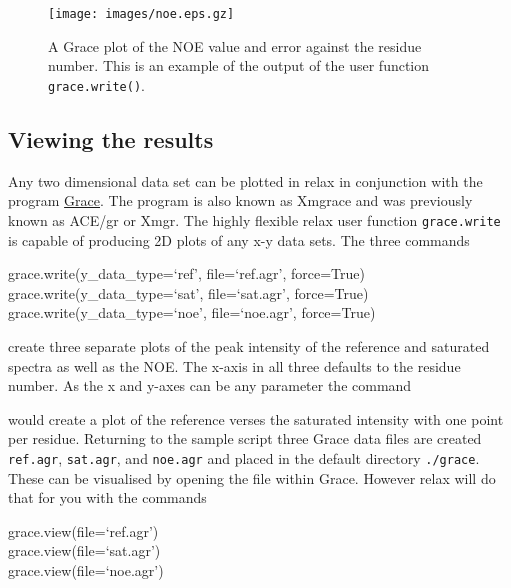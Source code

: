 
\begin{figure}
\centerline{\texttt{[image: images/noe.eps.gz]}}
\caption[NOE plot]{A Grace plot of the NOE value and error against the residue number.  This is an example of the output of the user function \texttt{grace.write()}.}\label{fig: NOE plot}
\end{figure}


\subsection{Viewing the results}

Any two dimensional data set can be plotted in relax in conjunction with the program \href{http://plasma-gate.weizmann.ac.il/Grace/}{Grace}.  The program is also known as Xmgrace and was previously known as ACE/gr or Xmgr.  The highly flexible relax user function \texttt{grace.write} is capable of producing 2D plots of any x-y data sets.  The three commands

\begin{exampleenv}
grace.write(y\_data\_type=`ref', file=`ref.agr', force=True) \\
grace.write(y\_data\_type=`sat', file=`sat.agr', force=True) \\
grace.write(y\_data\_type=`noe', file=`noe.agr', force=True)
\end{exampleenv}

create three separate plots of the peak intensity of the reference and saturated spectra as well as the NOE.  The x-axis in all three defaults to the residue number.  As the x and y-axes can be any parameter the command


would create a plot of the reference verses the saturated intensity with one point per residue.  Returning to the sample script three Grace data files are created \texttt{ref.agr}, \texttt{sat.agr}, and \texttt{noe.agr} and placed in the default directory \texttt{./grace}.  These can be visualised by opening the file within Grace.  However relax will do that for you with the commands

\begin{exampleenv}
grace.view(file=`ref.agr') \\
grace.view(file=`sat.agr') \\
grace.view(file=`noe.agr')
\end{exampleenv}

